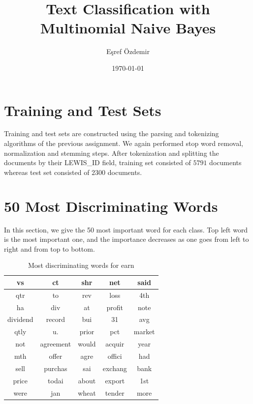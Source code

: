 \documentclass{article}
\title{Text Classification with Multinomial Naive Bayes}
\author{Eşref Özdemir}
\date{\today}
\begin{document}
\maketitle
\tableofcontents
\newpage

\section{Training and Test Sets}
Training and test sets are constructed using the parsing and tokenizing
algorithms of the previous assignment. We again performed stop word removal,
normalization and stemming steps. After tokenization and splitting the documents
by their LEWIS\_ID field, training set consisted of $5791$ documents whereas
test set consisted of $2300$ documents.

\section{50 Most Discriminating Words}
In this section, we give the 50 most important word for each class. Top left
word is the most important one, and the importance decreases as one goes from
left to right and from top to bottom.

\begin{table}[H]
	\caption{Most discriminating words for earn}
	\centering
	\begin{tabular}{|c|c|c|c|c|}
		\hline
		vs & ct & shr & net & said \\
		\hline
		qtr & to & rev & loss & 4th \\
		\hline
		ha & div & at & profit & note \\
		\hline
		dividend & record & bui & 31 & avg \\
		\hline
		qtly & u. & prior & pct & market \\
		\hline
		not & agreement & would & acquir & year \\
		\hline
		mth & offer & agre & offici & had \\
		\hline
		sell & purchas & sai & exchang & bank \\
		\hline
		price & todai & about & export & 1st \\
		\hline
		were & jan & wheat & tender & more \\
		\hline
	\end{tabular}
\end{table}
\end{document}
